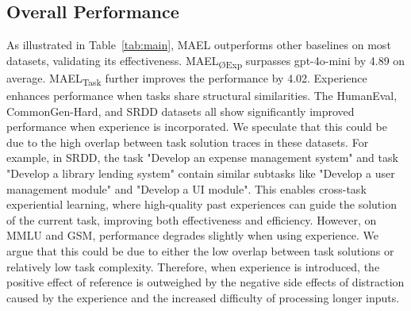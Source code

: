 \documentclass[preprint]{article}
\begin{document}
\subsection{Overall Performance}
As illustrated in Table~\ref{tab:main}, MAEL outperforms other baselines on most datasets, validating its effectiveness.
MAEL\textsubscript{ØExp} surpasses gpt-4o-mini by 4.89 on average.
MAEL\textsubscript{Task} further improves the performance by 4.02.
Experience enhances performance when tasks share structural similarities.
The HumanEval, CommonGen-Hard, and SRDD datasets all show significantly improved performance when experience is incorporated.
We speculate that this could be due to the high overlap between task solution traces in these datasets.
For example, in SRDD, the task "Develop an expense management system" and task "Develop a library lending system" contain similar subtasks like "Develop a user management module" and "Develop a UI module".
This enables cross-task experiential learning, where high-quality past experiences can guide the solution of the current task, improving both effectiveness and efficiency.
However, on MMLU and GSM, performance degrades slightly when using experience.
We argue that this could be due to either the low overlap between task solutions or relatively low task complexity.
Therefore, when experience is introduced, the positive effect of reference is outweighed by the negative side effects of distraction caused by the experience and the increased difficulty of processing longer inputs.
\end{document}
